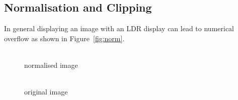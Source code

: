 \documentclass[12pt,a4paper,oneside,openright]{book}
\newcommand{\fig}[1]{Figure~\ref{fig:#1}}
\begin{document}
\begin{CJK}{UTF8}{}
\subsection{Normalisation and Clipping}
In general displaying an image with an \ac{LDR} display can lead to numerical overflow as shown in \fig{norm}.
\begin{figure}[htbp]
  \begin{center}
    \begin{minipage}[t]{.3\textwidth}
      \begin{center}
        \\
        normalised image
      \end{center}
    \end{minipage}
    \begin{minipage}[t]{.3\textwidth}
      \begin{center}
        \\
        original image
      \end{center}
    \end{minipage}
    \begin{minipage}[t]{.3\textwidth}
      \begin{center}
        \\

\end{center}
\end{minipage}
\end{center}
\end{figure}
\end{CJK}
\end{document}
